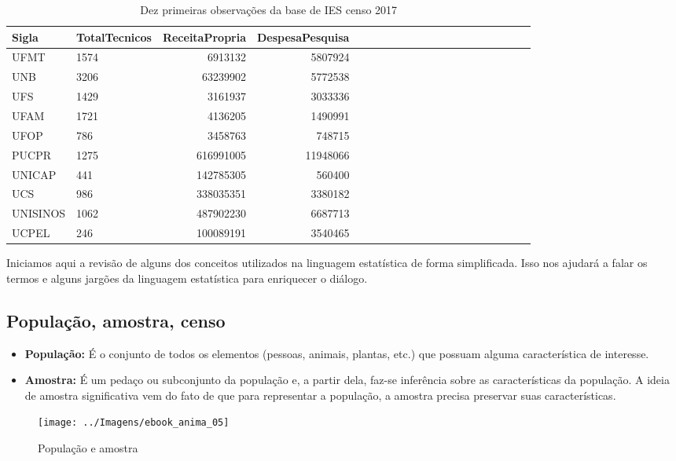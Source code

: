 \documentclass[11pt,]{style/krantz}
\theoremstyle{definition}
\theoremstyle{definition}
\theoremstyle{definition}
\theoremstyle{remark}
\begin{document}
\begin{table}[!h]

\caption{\label{tab:tab01}Dez primeiras observações da base de IES censo 2017}
\centering
\begin{tabular}{llrrrllrrrllrrrllrrr}
\toprule
Sigla & TotalTecnicos & ReceitaPropria & DespesaPesquisa\\
\midrule
UFMT & 1574 & 6913132 & 5807924\\
UNB & 3206 & 63239902 & 5772538\\
UFS & 1429 & 3161937 & 3033336\\
UFAM & 1721 & 4136205 & 1490991\\
UFOP & 786 & 3458763 & 748715\\
\addlinespace
PUCPR & 1275 & 616991005 & 11948066\\
UNICAP & 441 & 142785305 & 560400\\
UCS & 986 & 338035351 & 3380182\\
UNISINOS & 1062 & 487902230 & 6687713\\
UCPEL & 246 & 100089191 & 3540465\\
\bottomrule
\end{tabular}
\end{table}

Iniciamos aqui a revisão de alguns dos conceitos utilizados na linguagem estatística de forma simplificada. Isso nos ajudará a falar os termos e alguns jargões da linguagem estatística para enriquecer o diálogo.

\hypertarget{populacao-amostra-censo}{%
\subsection{População, amostra, censo}\label{populacao-amostra-censo}}

\begin{itemize}
\item
  \textbf{População:} É o conjunto de todos os elementos (pessoas, animais, plantas, etc.) que possuam alguma característica de interesse.
\item
  \textbf{Amostra:} É um pedaço ou subconjunto da população e, a partir dela, faz-se inferência sobre as características da população. A ideia de amostra significativa vem do fato de que para representar a população, a amostra precisa preservar suas características.
\end{itemize}

\begin{figure}[H]

{\centering \texttt{[image: ../Imagens/ebook\_anima\_05]}

}

\caption{População e amostra}\label{fig:fig05}
\end{figure}
\end{document}
